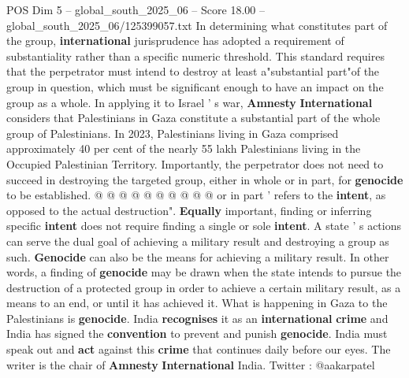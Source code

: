 \begin{textsample}{POS Dim 5 – global\_south\_2025\_06 – Score 18.00 – global\_south\_2025\_06/125399057.txt}
In determining what constitutes part of the group, \textbf{international} jurisprudence has adopted a requirement of substantiality rather than a specific numeric threshold.
This standard requires that the perpetrator must intend to destroy at least a"substantial part"of the group in question, which must be significant enough to have an impact on the group as a whole.
In applying it to Israel ' s war, \textbf{Amnesty} \textbf{International} considers that Palestinians in Gaza constitute a substantial part of the whole group of Palestinians.
In 2023, Palestinians living in Gaza comprised approximately 40 per cent of the nearly 55 lakh Palestinians living in the Occupied Palestinian Territory.
Importantly, the perpetrator does not need to succeed in destroying the targeted group, either in whole or in part, for \textbf{genocide} to be established. @ @ @ @ @ @ @ @ @ @ or in part ' refers to the \textbf{intent}, as opposed to the actual destruction". \textbf{Equally} important, finding or inferring specific \textbf{intent} does not require finding a single or sole \textbf{intent}.
A state ' s actions can serve the dual goal of achieving a military result and destroying a group as such. \textbf{Genocide} can also be the means for achieving a military result.
In other words, a finding of \textbf{genocide} may be drawn when the state intends to pursue the destruction of a protected group in order to achieve a certain military result, as a means to an end, or until it has achieved it.
What is happening in Gaza to the Palestinians is \textbf{genocide}.
India \textbf{recognises} it as an \textbf{international} \textbf{crime} and India has signed the \textbf{convention} to prevent and punish \textbf{genocide}.
India must speak out and \textbf{act} against this \textbf{crime} that continues daily before our eyes.
The writer is the chair of \textbf{Amnesty} \textbf{International} India.
Twitter : @aakarpatel

\end{textsample}
